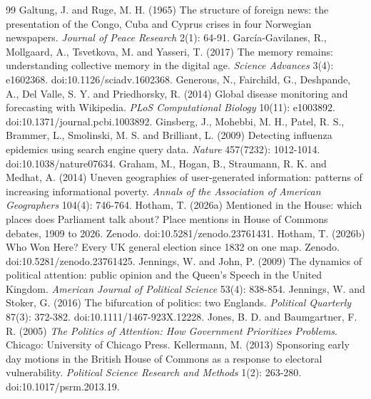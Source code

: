 \documentclass[11pt,a4paper]{article}
\begin{document}
\begin{thebibliography}{99}
 Galtung, J. and Ruge, M. H. (1965) The structure of foreign news: the presentation of the Congo, Cuba and Cyprus crises in four Norwegian newspapers. \emph{Journal of Peace Research} 2(1): 64-91.
 Garc\'ia-Gavilanes, R., Mollgaard, A., Tsvetkova, M. and Yasseri, T. (2017) The memory remains: understanding collective memory in the digital age. \emph{Science Advances} 3(4): e1602368. doi:10.1126/sciadv.1602368.
 Generous, N., Fairchild, G., Deshpande, A., Del Valle, S. Y. and Priedhorsky, R. (2014) Global disease monitoring and forecasting with Wikipedia. \emph{PLoS Computational Biology} 10(11): e1003892. doi:10.1371/journal.pcbi.1003892.
 Ginsberg, J., Mohebbi, M. H., Patel, R. S., Brammer, L., Smolinski, M. S. and Brilliant, L. (2009) Detecting influenza epidemics using search engine query data. \emph{Nature} 457(7232): 1012-1014. doi:10.1038/nature07634.
 Graham, M., Hogan, B., Straumann, R. K. and Medhat, A. (2014) Uneven geographies of user-generated information: patterns of increasing informational poverty. \emph{Annals of the Association of American Geographers} 104(4): 746-764.
 Hotham, T. (2026a) Mentioned in the House: which places does Parliament talk about? Place mentions in House of Commons debates, 1909 to 2026. Zenodo. doi:10.5281/zenodo.23761431.
 Hotham, T. (2026b) Who Won Here? Every UK general election since 1832 on one map. Zenodo. doi:10.5281/zenodo.23761425.
 Jennings, W. and John, P. (2009) The dynamics of political attention: public opinion and the Queen's Speech in the United Kingdom. \emph{American Journal of Political Science} 53(4): 838-854.
 Jennings, W. and Stoker, G. (2016) The bifurcation of politics: two Englands. \emph{Political Quarterly} 87(3): 372-382. doi:10.1111/1467-923X.12228.
 Jones, B. D. and Baumgartner, F. R. (2005) \emph{The Politics of Attention: How Government Prioritizes Problems}. Chicago: University of Chicago Press.
 Kellermann, M. (2013) Sponsoring early day motions in the British House of Commons as a response to electoral vulnerability. \emph{Political Science Research and Methods} 1(2): 263-280. doi:10.1017/psrm.2013.19.

\end{thebibliography}
\end{document}
